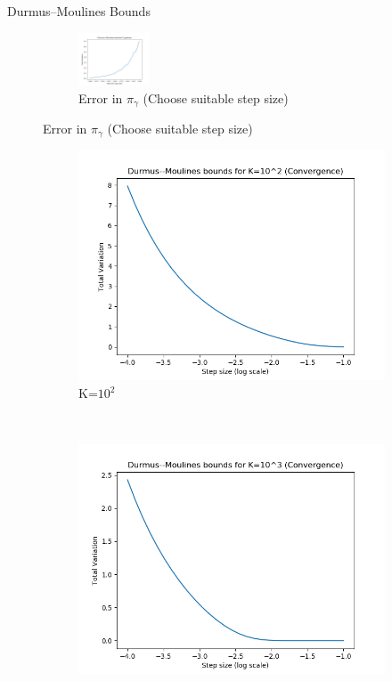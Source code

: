 \documentclass[aspectratio=169]{beamer}
\begin{document}
\begin{frame}{Durmus--Moulines Bounds}
\begin{figure}[h]
    \centering
    \begin{subfigure}[b]{\textwidth}
        \centering
        \includegraphics[width=0.23\textwidth]{Pi_gamma.png}
        \caption{Error in $\pi_\gamma$ (Choose suitable step size)}
    \end{subfigure}

\end{figure}
\begin{figure}[h]
    \centering
    \begin{subfigure}[b]{0.23\textwidth}
        \includegraphics[width=\textwidth]{ConvergenceK1e2.png}
        \caption{K=$10^2$}
    \end{subfigure}
    ~ %
    \begin{subfigure}[b]{0.23\textwidth}
        \includegraphics[width=\textwidth]{ConvergenceK1e3.png}

\end{subfigure}
\end{figure}
\end{frame}
\end{document}
